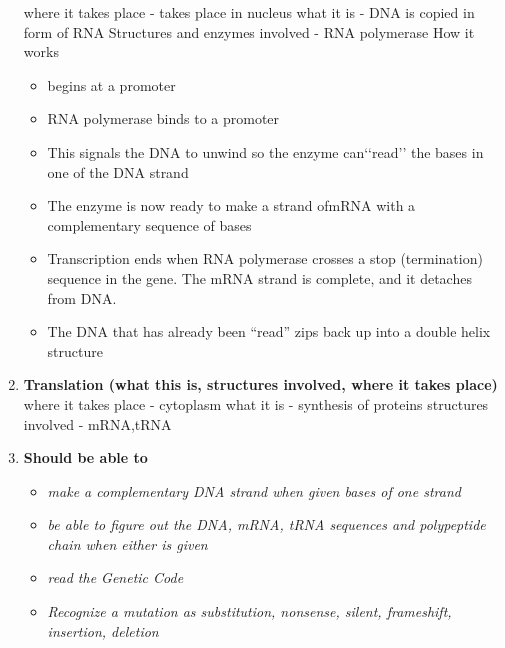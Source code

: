 \documentclass[9pt]{article}
\begin{document}
\begin{enumerate}
  where it takes place - takes place in nucleus
  what it is - DNA is copied in form of RNA
  Structures and enzymes involved - RNA polymerase
  How it works
  \begin{itemize}
    \item begins at a promoter
    \item RNA polymerase binds to a promoter
    \item  This signals the DNA to unwind so the enzyme can‘‘read’’ the bases in one of the DNA strand
    \item The enzyme is now ready to make a strand ofmRNA with a complementary sequence of bases
    \item Transcription ends when RNA polymerase crosses a stop (termination) sequence in the gene. The mRNA strand is complete, and it detaches from DNA.
    \item  The DNA that has already been “read” zips back up into a double helix structure
  \end{itemize}
  \item {\bf Translation (what this is, structures involved, where it takes place)}
  where it takes place - cytoplasm
  what it is  - synthesis of proteins
  structures involved - mRNA,tRNA
  \item {\bf Should be able to}
    \begin{itemize}
      \item {\em make a complementary DNA strand when given bases of one strand}
      \item {\em be able to figure out the DNA, mRNA, tRNA sequences and polypeptide chain when either is given}
      \item {\em read the Genetic Code}
      \item {\em Recognize a mutation as substitution, nonsense, silent, frameshift, insertion, deletion}
    \end{itemize}
\end{enumerate}
\end{document}
